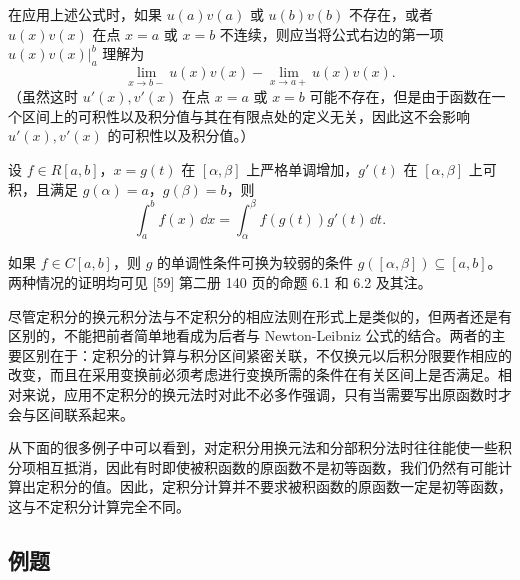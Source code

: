 \begin{xremark}
在应用上述公式时，如果 $u(a)v(a)$ 或 $u(b)v(b)$ 不存在，或者 $u(x)v(x)$ 在点 $x=a$ 或 $x=b$ 不连续，则应当将公式右边的第一项 $u(x)v(x)|_a^b$ 理解为
\[
  \lim_{x\to b-}u(x)v(x)-\lim_{x\to a+}u(x)v(x).
\]
（虽然这时 $u'(x),v'(x)$ 在点 $x=a$ 或 $x=b$ 可能不存在，但是由于函数在一个区间上的可积性以及积分值与其在有限点处的定义无关，因此这不会影响 $u'(x),v'(x)$ 的可积性以及积分值。）
\end{xremark}

\begin{xtheorem}[10.4.2（定积分的换元积分法）]
设 $f\in R[a,b]$，$x=g(t)$ 在 $[\alpha,\beta]$ 上严格单调增加，$g'(t)$ 在 $[\alpha,\beta]$ 上可积，且满足 $g(\alpha)=a$，$g(\beta)=b$，则
\[
  \int_a^b f(x)\,\dd x=\int_\alpha^\beta f(g(t))g'(t)\,\dd t.
\]
\end{xtheorem}

\begin{xremark}
如果 $f\in C[a,b]$，则 $g$ 的单调性条件可换为较弱的条件 $g([\alpha,\beta])\subseteq[a,b]$。两种情况的证明均可见 [59] 第二册 140 页的命题 6.1 和 6.2 及其注。
\end{xremark}

\begin{xremark}
尽管定积分的换元积分法与不定积分的相应法则在形式上是类似的，但两者还是有区别的，不能把前者简单地看成为后者与 Newton-Leibniz 公式的结合。两者的主要区别在于：定积分的计算与积分区间紧密关联，不仅换元以后积分限要作相应的改变，而且在采用变换前必须考虑进行变换所需的条件在有关区间上是否满足。相对来说，应用不定积分的换元法时对此不必多作强调，只有当需要写出原函数时才会与区间联系起来。

从下面的很多例子中可以看到，对定积分用换元法和分部积分法时往往能使一些积分项相互抵消，因此有时即使被积函数的原函数不是初等函数，我们仍然有可能计算出定积分的值。因此，定积分计算并不要求被积函数的原函数一定是初等函数，这与不定积分计算完全不同。
\end{xremark}

\subsection{例题}

